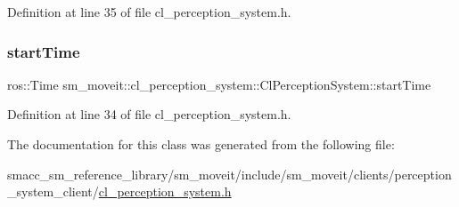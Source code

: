 Definition at line 35 of file cl\+\_\+perception\+\_\+system.\+h.

\mbox{\label{classsm__moveit_1_1cl__perception__system_1_1ClPerceptionSystem_a115fa9b61255bafa00931484f60d993a}} 
\subsubsection{\texorpdfstring{start\+Time}{startTime}}
{\footnotesize\ttfamily ros\+::\+Time sm\+\_\+moveit\+::cl\+\_\+perception\+\_\+system\+::\+Cl\+Perception\+System\+::start\+Time}



Definition at line 34 of file cl\+\_\+perception\+\_\+system.\+h.



The documentation for this class was generated from the following file\+:\begin{DoxyCompactItemize}
\item 
smacc\+\_\+sm\+\_\+reference\+\_\+library/sm\+\_\+moveit/include/sm\+\_\+moveit/clients/perception\+\_\+system\+\_\+client/\hyperlink{include_2sm__moveit_2clients_2perception__system__client_2cl__perception__system_8h}{cl\+\_\+perception\+\_\+system.\+h}\end{DoxyCompactItemize}
